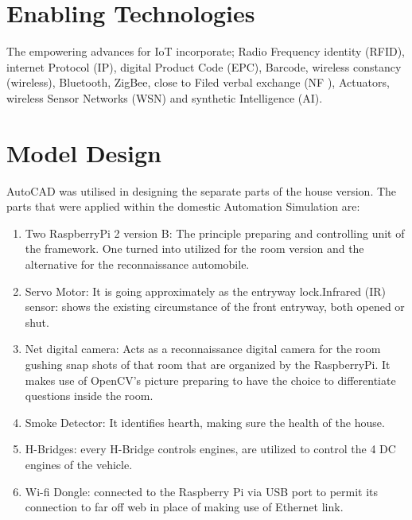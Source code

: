 \documentclass[12pt, letterpaper]{article}
\begin{document}
\hspace{1cm}

\section{Enabling Technologies}
The empowering advances for IoT incorporate; Radio Frequency identity (RFID),
internet Protocol (IP), digital Product Code (EPC), Barcode, wireless
constancy (wireless), Bluetooth, ZigBee, close to Filed verbal exchange (NF
), Actuators, wireless Sensor Networks (WSN) and synthetic Intelligence (AI).

\hspace{1cm}

\section{Model Design}
AutoCAD was utilised in designing the separate parts of the house version.
The parts that were applied within the domestic Automation Simulation are:
\begin{enumerate}
\item Two RaspberryPi 2 version B: The principle
    preparing and controlling unit of the framework.
    One turned into utilized for the room version and the
    alternative for the reconnaissance automobile.

\item Servo Motor: It is going approximately as the
entryway lock.Infrared (IR) sensor: shows the existing
    circumstance of the front entryway, both opened
    or shut.

\item Net digital camera: Acts as a reconnaissance digital
camera for the room gushing snap shots of that room
that are organized by the RaspberryPi. It makes use
of OpenCV's picture preparing to have the choice to
differentiate questions inside the room.
\item Smoke Detector: It identifies hearth, making sure the
health of the house.
\item H-Bridges: every H-Bridge controls engines, are
utilized to control the 4 DC engines of the vehicle.
\item Wi-fi Dongle: connected to the Raspberry Pi via
USB port to permit its connection to far off web in
place of making use of Ethernet link.
\end{enumerate}

\hspace{1cm}
\end{document}
